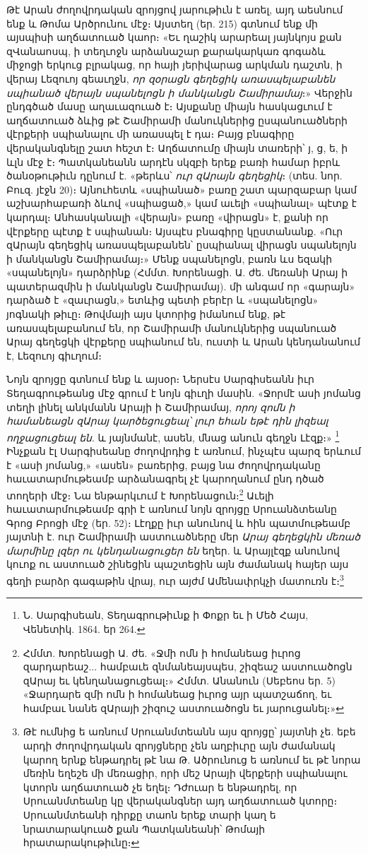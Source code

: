 \documentclass{article}
\begin{document}
{Թէ Արան ժողովրդական զրոյցով յարութիւն է առել, այդ աեսնում ենք և Թոմա Արծրունու մէջ։ Այստեղ (եր. 215) գտնում ենք մի այսպիսի աղճատուած կաոր։ «Եւ ղաշիկ արարեալ յայնկոյս քան զՎանաոսպ, ի տեղւոջն արձանաշար քարակարկառ գոգաձև միջոցի երկուց բլրակաց, որ հայի յերիվարաց արկման դաշտն, ի վերայ Լեզուոյ գեաւղջն, \emph{որ զօրացն գեղեցիկ առասպելաբանեն սպիանած վերայն սպանելոցն ի մանկանցն Շամիրամայ}։» Վերջին ընդգծած մասը աղաւազուած է։ Այսքանը միայն հասկացւում է աղճատուած ձևից թէ Շամիրամի մանուկներից ըսպանուածների վէրքերի սպիանալու մի առասպել է դա։ Բայց բնագիրը վերականգնելը շատ հեշտ է։ Աղճատումը միայն տառերի՝ յ, ց, ե, ի ևլն մէջ է։ Պատկանեանն արդէն սկզբի երեք բառի համար իբրև ծանօթութիւն դընում է. «թերևս՝ \emph{ուր զԱրայն գեղեցիկ}։ (տես. նոր. Բուզ. յէջն 20)։ Այնուհետև «սպիանած» բառը շատ պարզաբար կամ աշխարհաբառի ձևով «սպիացած,» կամ աւելի «սպիանալ» պէտք է կարդալ։ Անհասկանալի «վերայն» բառը «վիրացն» է, քանի որ վէրքերը պէտք է սպիանան։ Այսպէս բնագիրը կըստանանք. «Ուր զԱրայն գեղեցիկ առասպելաբանեն՝ ըսպիանալ վիրացն սպանելոյն ի մանկանցն Շամիրամայ։» Մենք սպանելոցն, բառն ևս եզակի «սպանելոյն» դարձրինք (Հմմտ. Խորենացի. Ա. ժե. մեռանի Արայ ի պատերազմին ի մանկանցն Շամիրամայ). մի անգամ որ «գարայն» դարձած է «զաւրացն,» ետևից պետի բերէր և «սպանելոցն» յոգնակի թիւը։ Թովմայի այս կտորից իմանում ենք, թէ առասպելաբանում են, որ Շամիրամի մանուկներից սպանուած Արայ գեղեցկի վէրքերը սպիանում են, ուստի և Արան կենդանանում է, Լեզուոյ գիւղում։

Նոյն զրոյցը գտնում ենք և այսօր։ Ներսէս Սարգիսեանն իւր Տեղագրութեանց մէջ գրում է նոյն գիւղի մասին. «Ջորմէ ասի յոմանց տեղի լինել անկմանն Արայի ի Շամիրամայ, \emph{որոյ զոմն ի համանեացն զԱրայ կարծեցուցեալ՝ լուր եհան եթէ դին լիզեալ ողջացուցեալ են}. և յայնմանէ, ասեն, մնաց անուն գեղջն Լէզք։» \footnote{Ն. Սարգիսեան, Տեղագրութիւնք ի Փոքր եւ ի Մեծ Հայս, Վենետիկ. 1864. եր 264.} Ինչքան էլ Սարգիսեանը ժողովրդից է առնում, ինչպէս պարզ երևում է «ասի յոմանց,» «ասեն» բառերից, բայց նա ժողովրդականը հաւատարմութեամբ արձանագրել չէ կարողանում ընդ դծած տողերի մէջ։ Նա ենթարկւում է Խորենացուն։\footnote{Հմմտ. Խորենացի Ա. ժե. «Ջմի ոմն ի հոմանեաց իւրոց զարդարեաշ... համբաւե զնմանեայսպես, շիզեաշ աստուածոցն զԱրայ եւ կենղանացուցեալ։» Հմմտ. Անանուն (Սեբեոս եր. 5) «Ջարդարե զմի ոմն ի հոմանեաց իւրոց այր պատշաճող, եւ համբաւ նանե զԱրայի շիզուշ աստուածոցն եւ յարուցանել։»} Աւելի հաւատարմութեամբ գրի է առնում նոյն զրոյցը Սրուանձտեանը Գրոց Բրոցի մէջ (եր. 52)։ Լէղքը իւր անունով և հին պատմութեամբ յայտնի է. ուր Շամիրամի աստուածները մեր \emph{Արայ գեղեցկին մեռած մարմինը լզեր ու կենդանացուցեր են} եղեր. և Արայլէզք անունով կուոք ու աստուած շինեցին պաշտեցին այն ժամանակ հայեր այս գեղի բարձր գագաթին վրայ, ուր այժմ Ամենափրկչի մատուռն է։\footnote{Թէ ումնից ե առնում Սրուանմտեանն այս զրոյցը՝ յայտնի չե. եբե արդի ժողովրդական զրոյցները չեն աղբիւրը այն ժամանակ կարող երնք ենթադրել թէ նա Թ. Ածրունուց ե առնում եւ թէ նորա մեռին եղեշե մի մեռացիր, որի մեշ Արայի վերքերի սպիանալու կտորն աղճատուած չե եղել։ Դժուար ե ենթադրել, որ Սրուանմտեանը կը վերականգներ այդ աղճատուած կտորը։ Սրուանմտեանի դիրքը տաոն երեք տարի կաղ ե նրատարակուած քան Պատկանեանի՝ Թոմայի հրատարակութիւնը։}

}
\end{document}
